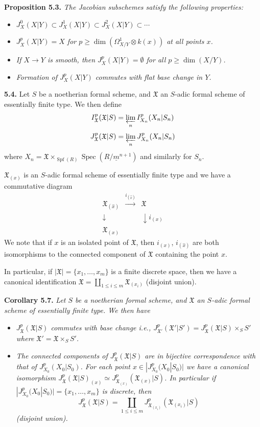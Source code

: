 \documentclass[11pt]{article}
\theoremstyle{plain}
\theoremstyle{definition}
\theoremstyle{remark}
\DeclareMathOperator{\Spec}{Spec}
\DeclareMathOperator{\Spf}{Spf}
\begin{document}
\medskip
\noindent\textbf{Proposition 5.3.} \textit{The Jacobian subschemes satisfy the following properties:}
\begin{itemize}
\item[(i)] \textit{$J_X^0(X|Y) \subset J_X^1(X|Y) \subset J_X^2(X|Y) \subset \cdots$}
\item[(ii)] \textit{$J_X^p(X|Y) = X$ for $p \geq \dim(\Omega_{X/Y}^1 \otimes k(x))$ at all points $x$.}
\item[(iii)] \textit{If $X \to Y$ is smooth, then $J_X^p(X|Y) = \emptyset$ for all $p \geq \dim(X/Y)$.}
\item[(iv)] \textit{Formation of $J_X^p(X|Y)$ commutes with flat base change in $Y$.}
\end{itemize}

\medskip
\noindent\textbf{5.4.} Let $S$ be a noetherian formal scheme, and $\mathfrak{X}$ an $S$-adic formal scheme of essentially finite type. We then define
\[I_{\mathfrak{X}}^p(\mathfrak{X}|S) = \varprojlim_n I_{X_n}^p(X_n|S_n)\]
\[J_{\mathfrak{X}}^p(\mathfrak{X}|S) = \varprojlim_n J_{X_n}^p(X_n|S_n)\]
where $X_n = \mathfrak{X} \times_{\Spf(R)} \Spec(R/\underline{m}^{n+1})$ and similarly for $S_n$.

$\mathfrak{X}_{(x)}$ is an $S$-adic formal scheme of essentially finite type and we have a commutative diagram
\[
\begin{array}{ccc}
\mathfrak{X}_{(\hat{x})} & \xrightarrow{i_{(\hat{x})}} & \mathfrak{X} \\
\downarrow & & \downarrow\scriptstyle{i_{(x)}} \\
\mathfrak{X}_{(x)} & &
\end{array}
\]
We note that if $x$ is an isolated point of $\mathfrak{X}$, then $i_{(x)}$, $i_{(\hat{x})}$ are both isomorphisms to the connected component of $\mathfrak{X}$ containing the point $x$.

In particular, if $|\mathfrak{X}| = \{x_1, \ldots, x_m\}$ is a finite discrete space, then we have a canonical identification $\mathfrak{X} = \coprod\limits_{1 \leq i \leq m} \mathfrak{X}_{(x_i)}$ (disjoint union).

\medskip
\noindent\textbf{Corollary 5.7.} \textit{Let $S$ be a noetherian formal scheme, and $\mathfrak{X}$ an $S$-adic formal scheme of essentially finite type. We then have}
\begin{itemize}
\item[(1)] \textit{$J_{\mathfrak{X}}^p(\mathfrak{X}|S)$ commutes with base change i.e., $J_{\mathfrak{X}'}^p(\mathfrak{X}'|S') = J_{\mathfrak{X}}^p(\mathfrak{X}|S) \times_S S'$ where $\mathfrak{X}' = \mathfrak{X} \times_S S'$.}
\item[(2)] \textit{The connected components of $J_{\mathfrak{X}}^p(\mathfrak{X}|S)$ are in bijective correspondence with that of $J_{X_0}^p(X_0|S_0)$. For each point $x \in |J_{X_0}^p(X_0|S_0)|$ we have a canonical isomorphism $J_{\mathfrak{X}}^p(\mathfrak{X}|S)_{(x)} \simeq J_{\mathfrak{X}_{(x)}}^p(\mathfrak{X}_{(x)}|S)$. In particular if $|J_{X_0}^p(X_0|S_0)| = \{x_1, \ldots, x_m\}$ is discrete, then}
\[J_{\mathfrak{X}}^p(\mathfrak{X}|S) = \coprod_{1 \leq i \leq m} J_{\mathfrak{X}_{(x_i)}}^p(\mathfrak{X}_{(x_i)}|S)\]
\textit{(disjoint union).}
\end{itemize}
\end{document}
